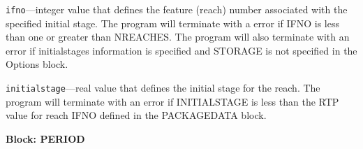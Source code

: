 \begin{description}
\item \texttt{ifno}---integer value that defines the feature (reach) number associated with the specified initial stage. The program will terminate with a error if IFNO is less than one or greater than NREACHES. The program will also terminate with an error if initialstages information is specified and STORAGE is not specified in the Options block.

\item \texttt{initialstage}---real value that defines the initial stage for the reach. The program will terminate with an error if INITIALSTAGE is less than the RTP value for reach IFNO defined in the PACKAGEDATA block.

\end{description}
\item \textbf{Block: PERIOD}

